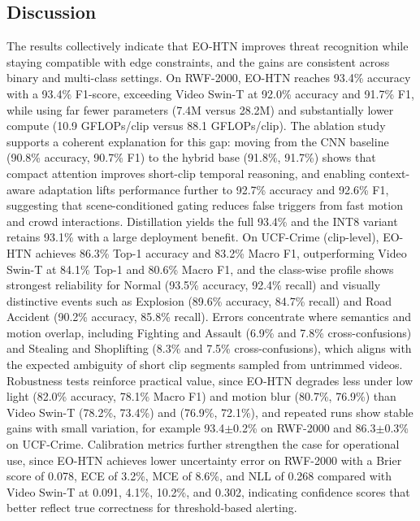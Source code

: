 \documentclass[AMA,Times1COL]{WileyNJDv5} %
\begin{document}
\subsection{Discussion}
The results collectively indicate that EO-HTN improves threat recognition while staying compatible with edge constraints, and the gains are consistent across binary and multi-class settings. On RWF-2000, EO-HTN reaches 93.4\% accuracy with a 93.4\% F1-score, exceeding Video Swin-T at 92.0\% accuracy and 91.7\% F1, while using far fewer parameters (7.4M versus 28.2M) and substantially lower compute (10.9 GFLOPs/clip versus 88.1 GFLOPs/clip). The ablation study supports a coherent explanation for this gap: moving from the CNN baseline (90.8\% accuracy, 90.7\% F1) to the hybrid base (91.8\%, 91.7\%) shows that compact attention improves short-clip temporal reasoning, and enabling context-aware adaptation lifts performance further to 92.7\% accuracy and 92.6\% F1, suggesting that scene-conditioned gating reduces false triggers from fast motion and crowd interactions. Distillation yields the full 93.4\% and the INT8 variant retains 93.1\% with a large deployment benefit. On UCF-Crime (clip-level), EO-HTN achieves 86.3\% Top-1 accuracy and 83.2\% Macro F1, outperforming Video Swin-T at 84.1\% Top-1 and 80.6\% Macro F1, and the class-wise profile shows strongest reliability for Normal (93.5\% accuracy, 92.4\% recall) and visually distinctive events such as Explosion (89.6\% accuracy, 84.7\% recall) and Road Accident (90.2\% accuracy, 85.8\% recall). Errors concentrate where semantics and motion overlap, including Fighting and Assault (6.9\% and 7.8\% cross-confusions) and Stealing and Shoplifting (8.3\% and 7.5\% cross-confusions), which aligns with the expected ambiguity of short clip segments sampled from untrimmed videos. Robustness tests reinforce practical value, since EO-HTN degrades less under low light (82.0\% accuracy, 78.1\% Macro F1) and motion blur (80.7\%, 76.9\%) than Video Swin-T (78.2\%, 73.4\%) and (76.9\%, 72.1\%), and repeated runs show stable gains with small variation, for example 93.4$\pm$0.2\% on RWF-2000 and 86.3$\pm$0.3\% on UCF-Crime. Calibration metrics further strengthen the case for operational use, since EO-HTN achieves lower uncertainty error on RWF-2000 with a Brier score of 0.078, ECE of 3.2\%, MCE of 8.6\%, and NLL of 0.268 compared with Video Swin-T at 0.091, 4.1\%, 10.2\%, and 0.302, indicating confidence scores that better reflect true correctness for threshold-based alerting.
\end{document}
